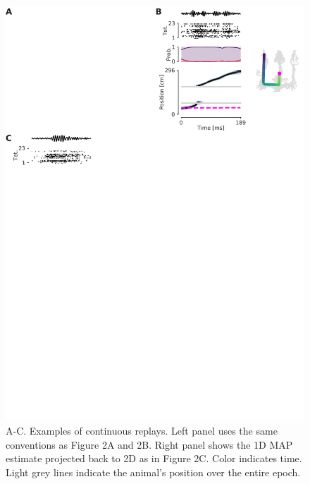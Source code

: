 \documentclass[times, twoside]{zHenriquesLab-StyleBioRxiv}
\begin{document}
\begin{figure}%
\centering
\includegraphics[width=0.80\linewidth]{figures/Figure2-supplemental2/Figure2_v4-supplemental2}
\caption{A-C. Examples of continuous replays. Left panel uses the same conventions as Figure 2A and 2B. Right panel shows the 1D MAP estimate projected back to 2D as in Figure 2C. Color indicates time. Light grey lines indicate the animal's position over the entire epoch.}
\label{fig:Figure2-Figure supplement 2}
\end{figure}
\end{document}
